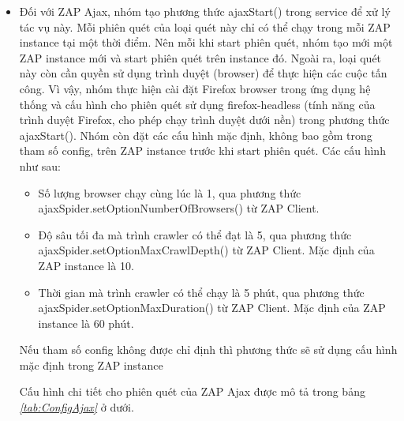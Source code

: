 \begin{itemize}
  \item Đối với ZAP Ajax, nhóm tạo phương thức ajaxStart() trong service để xử lý tác vụ này. Mỗi phiên quét của loại quét này chỉ có thể chạy trong mỗi ZAP instance tại một thời điểm. Nên mỗi khi start phiên quét, nhóm tạo mới một ZAP instance mới và start phiên quét trên instance đó. Ngoài ra, loại quét này còn cần quyền sử dụng trình duyệt (browser) để thực hiện các cuộc tấn công. Vì vậy, nhóm thực hiện cài đặt Firefox browser trong ứng dụng hệ thống và cấu hình cho phiên quét sử dụng firefox-headless (tính năng của trình duyệt Firefox, cho phép chạy trình duyệt dưới nền) trong phương thức ajaxStart(). Nhóm còn đặt các cấu hình mặc định, không bao gồm trong tham số config, trên ZAP instance trước khi start phiên quét. Các cấu hình như sau:
        \begin{itemize}
          \item Số lượng browser chạy cùng lúc là 1, qua phương thức \\
                ajaxSpider.setOptionNumberOfBrowsers() từ ZAP Client.
          \item Độ sâu tối đa mà trình crawler có thể đạt là 5, qua phương thức \\
                ajaxSpider.setOptionMaxCrawlDepth() từ ZAP Client. Mặc định của ZAP instance là 10.
          \item Thời gian mà trình crawler có thể chạy là 5 phút, qua phương thức \\
                ajaxSpider.setOptionMaxDuration() từ ZAP Client. Mặc định của ZAP instance là 60 phút.
        \end{itemize}
        Nếu tham số config không được chỉ định thì phương thức sẽ sử dụng cấu hình mặc định trong ZAP instance

        Cấu hình chi tiết cho phiên quét của ZAP Ajax được mô tả trong bảng \textit{\ref{tab:ConfigAjax} } ở dưới.


\end{itemize}
